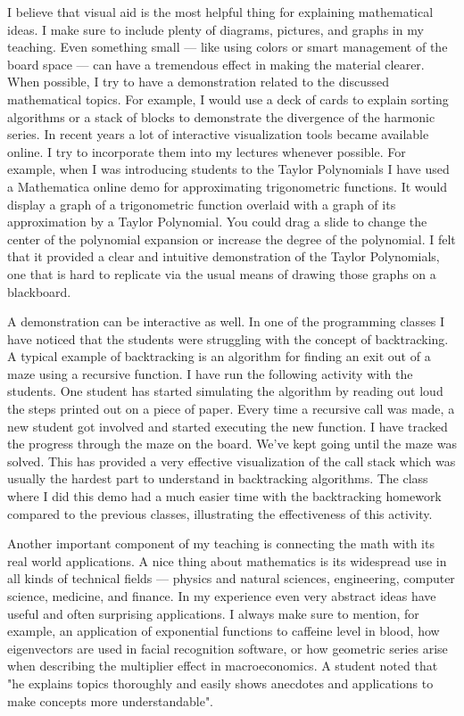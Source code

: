 \documentclass[11pt]{article}
\begin{document}
I believe that visual aid is the most helpful thing for explaining mathematical ideas.
I make sure to include plenty of diagrams, pictures, and graphs in my teaching.
Even something small --- like using colors or smart management of the board space --- can have a tremendous effect in making the material clearer.
When possible, I try to have a demonstration related to the discussed mathematical topics.
For example, I would use a deck of cards to explain sorting algorithms
or a stack of blocks to demonstrate the divergence of the harmonic series.
In recent years a lot of interactive visualization tools became available online.
I try to incorporate them into my lectures whenever possible.
For example, when I was introducing students to the Taylor Polynomials I have used a Mathematica online demo for approximating trigonometric functions.
It would display a graph of a trigonometric function overlaid with a graph of its approximation by a Taylor Polynomial.
You could drag a slide to change the center of the polynomial expansion or increase the degree of the polynomial.
I felt that it provided a clear and intuitive demonstration of the Taylor Polynomials,
one that is hard to replicate via the usual means of drawing those graphs on a blackboard.

A demonstration can be interactive as well.
In one of the programming classes I have noticed that the students were struggling with the concept of backtracking.
A typical example of backtracking is an algorithm for finding an exit out of a maze using a recursive function.
I have run the following activity with the students.
One student has started simulating the algorithm by reading out loud the steps printed out on a piece of paper.
Every time a recursive call was made, a new student got involved and started executing the new function. 
I have tracked the progress through the maze on the board.
We've kept going until the maze was solved.
This has provided a very effective visualization of the call stack which was usually the hardest part to understand in backtracking algorithms.
The class where I did this demo had a much easier time with the backtracking homework compared to the previous classes,
illustrating the effectiveness of this activity.

Another important component of my teaching is connecting the math with its real world applications.
A nice thing about mathematics is its widespread use in all kinds of technical fields
--- physics and natural sciences, engineering, computer science, medicine, and finance.
In my experience even very abstract ideas have useful and often surprising applications.
I always make sure to mention, for example, an application of exponential functions to caffeine level in blood,
how eigenvectors are used in facial recognition software,
or how geometric series arise when describing the multiplier effect in macroeconomics.
A student noted that "he explains topics thoroughly and easily shows anecdotes and applications to make concepts more understandable".
\end{document}
